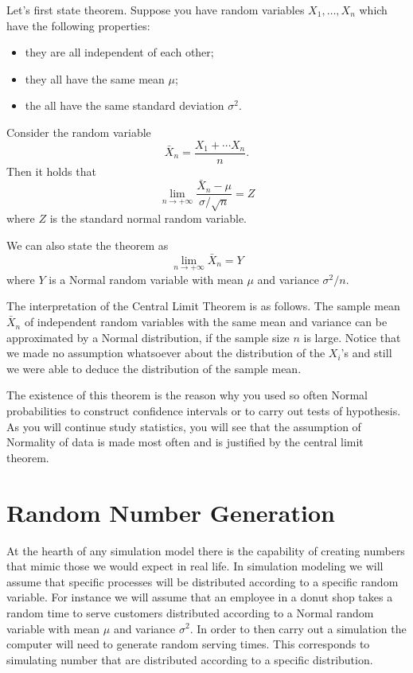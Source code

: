 \documentclass[
]{book}
\theoremstyle{definition}
\theoremstyle{definition}
\theoremstyle{definition}
\theoremstyle{definition}
\theoremstyle{remark}
\begin{document}
Let's first state theorem. Suppose you have random variables \(X_1,\dots, X_n\) which have the following properties:

\begin{itemize}
\item
  they are all independent of each other;
\item
  they all have the same mean \(\mu\);
\item
  the all have the same standard deviation \(\sigma^2\).
\end{itemize}

Consider the random variable
\[
\bar{X}_n= \frac{X_1+\cdots X_n}{n}.
\]
Then it holds that
\[
\lim_{n\rightarrow + \infty} \frac{\bar{X}_n-\mu}{\sigma/\sqrt{n}} = Z
\]
where \(Z\) is the standard normal random variable.

We can also state the theorem as
\[
\lim_{n\rightarrow + \infty} \bar{X}_n = Y
\]
where \(Y\) is a Normal random variable with mean \(\mu\) and variance \(\sigma^2/n\).

The interpretation of the Central Limit Theorem is as follows. The sample mean \(\bar{X}_n\) of independent random variables with the same mean and variance can be approximated by a Normal distribution, if the sample size \(n\) is large. Notice that we made no assumption whatsoever about the distribution of the \(X_i\)'s and still we were able to deduce the distribution of the sample mean.

The existence of this theorem is the reason why you used so often Normal probabilities to construct confidence intervals or to carry out tests of hypothesis. As you will continue study statistics, you will see that the assumption of Normality of data is made most often and is justified by the central limit theorem.

\hypertarget{random-number-generation}{%
\chapter{Random Number Generation}\label{random-number-generation}}

At the hearth of any simulation model there is the capability of creating numbers that mimic those we would expect in real life. In simulation modeling we will assume that specific processes will be distributed according to a specific random variable. For instance we will assume that an employee in a donut shop takes a random time to serve customers distributed according to a Normal random variable with mean \(\mu\) and variance \(\sigma^2\). In order to then carry out a simulation the computer will need to generate random serving times. This corresponds to simulating number that are distributed according to a specific distribution.
\end{document}

